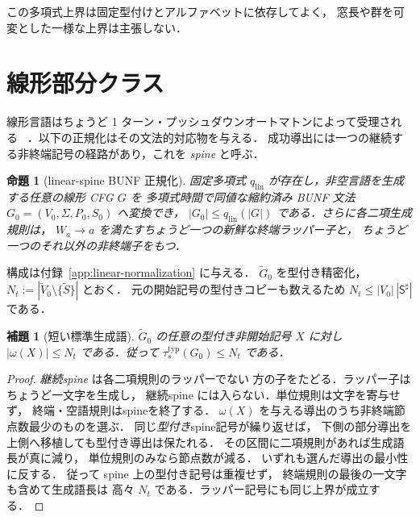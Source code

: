 \documentclass[11pt,a4paper]{ltjsarticle}
\newtheorem{lemma}[theorem]{補題}
\newtheorem{proposition}[theorem]{命題}
\theoremstyle{remark}
\theoremstyle{plain}
\begin{document}
この多項式上界は固定型付けとアルファベットに依存してよく，
窓長や群を可変とした一様な上界は主張しない．

\section{線形部分クラス}
\label{sec:linear}

線形言語はちょうど 1 ターン・プッシュダウンオートマトンによって受理される
~\cite{ginsburg-spanier1966,autebert1997}．以下の正規化はその文法的対応物を与える．
成功導出には一つの継続する非終端記号の経路があり，これを \emph{spine} と呼ぶ．

\begin{proposition}[linear-spine BUNF 正規化]\label{prop:linear-normal}
固定多項式 $q_{\mathrm{lin}}$ が存在し，非空言語を生成する任意の線形 CFG $G$ を
多項式時間で同値な縮約済み BUNF 文法 $G_0=(V_0,\Sigma,P_0,S_0)$ へ変換でき，
$|G_0|\le q_{\mathrm{lin}}(|G|)$ である．さらに各二項生成規則は，
$W_a\to a$ を満たすちょうど一つの新鮮な終端ラッパー子と，
ちょうど一つのそれ以外の非終端子をもつ．
\end{proposition}

構成は付録~\ref{app:linear-normalization} に与える．
$\widetilde G_0$ を型付き精密化，
$N_t:=|\widetilde V_0\setminus\{\widetilde S\}|$ とおく．
元の開始記号の型付きコピーも数えるため
$N_t\le|V_0|\,|\mathsf S^\sharp|$ である．

\begin{lemma}[短い標準生成語]\label{lem:linear-short}
$\widetilde G_0$ の任意の型付き非開始記号 $X$ に対し
$|\omega(X)|\le N_t$
である．従って $\tau_s^{\mathrm{typ}}(G_0)\le N_t$ である．
\end{lemma}

\begin{proof}
\emph{継続spine} は各二項規則のラッパーでない
方の子をたどる．ラッパー子はちょうど一文字を生成し，
継続spine には入らない．単位規則は文字を寄与せず，
終端・空語規則はspineを終了する．
$\omega(X)$ を与える導出のうち非終端節点数最少のものを選ぶ．
同じ\emph{型付き}spine記号が繰り返せば，
下側の部分導出を上側へ移植しても型付き導出は保たれる．
その区間に二項規則があれば生成語長が真に減り，
単位規則のみなら節点数が減る．
いずれも選んだ導出の最小性に反する．
従って spine 上の型付き記号は重複せず，
終端規則の最後の一文字も含めて生成語長は
高々 $N_t$ である．ラッパー記号にも同じ上界が成立する．
\end{proof}
\end{document}
